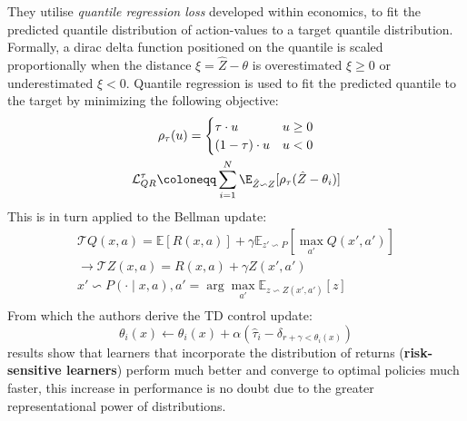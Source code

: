 They utilise \emph{quantile regression loss} developed within economics, to fit the predicted
quantile distribution of action-values to a target quantile distribution. Formally, a dirac delta
function positioned on the quantile is scaled proportionally when the distance $\xi = \hat{Z} - \theta$ 
is overestimated $\xi \geq 0$ or underestimated $\xi < 0$. Quantile regression is used
to fit the predicted quantile to the target by minimizing the following objective:
\begin{equation}
    \begin{gathered}
        \rho_\tau(u) = \begin{cases}
            \tau \cdot u & u \geq 0 \\ %
            (1 - \tau) \cdot u & u < 0
        \end{cases} \\
        \mathcal{L}^\tau_{QR} \coloneqq  \sum_{i=1}^N \E_{\hat{Z} \backsim Z}[\rho_\tau(\hat{Z} -\theta_i)]
    \end{gathered}
\end{equation}
This is in turn applied to the Bellman update: 
\begin{equation}
    \begin{gathered}
        \mathcal{T}Q(x,a) = \mathbb{E}[R(x,a)] + \gamma \mathbb{E}_{z' \backsim P}[\max_{a'}Q(x',a')] \\
        \rightarrow \mathcal{T}Z(x,a) = R(x,a) + \gamma Z(x',a') \\
        x' \backsim P(\cdot \mid x,a), a' = \arg \max_{a'} \mathbb{E}_{z \backsim Z(x',a')}[z] \\
    \end{gathered}
\end{equation}
From which the authors derive the TD control update:
\begin{equation}
    \theta_i(x) \leftarrow \theta_i(x) + \alpha(\hat{\tau}_i - \delta_{r + \gamma < \theta_i(x)})
\end{equation}
\cite{Dabney2017} results show that learners that incorporate the distribution of returns (\textbf{risk-sensitive learners})
perform much better and converge to optimal policies much faster, this increase in performance is no doubt
due to the greater representational power of distributions.